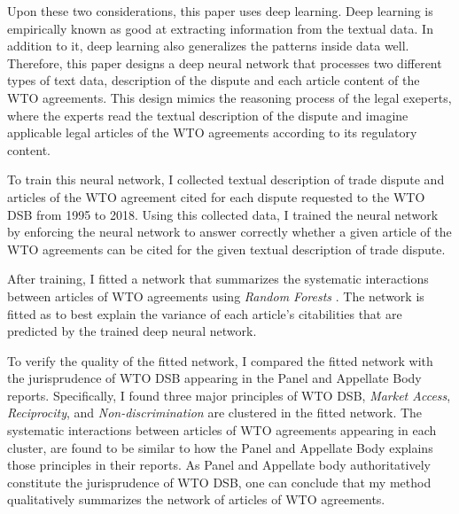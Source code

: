 Upon these two considerations, this paper uses deep learning. %
Deep learning is empirically known as good at extracting information from the textual data. 
In addition to it, deep learning also generalizes the patterns inside data well.
Therefore, this paper designs a deep neural network that
processes two different types of text data,
description of the dispute and each article content of the WTO agreements.
This design mimics the reasoning process of the legal exeperts, 
where the experts read
the textual description of the dispute and imagine applicable legal articles of the WTO agreements according to its regulatory content.

To train this neural network, I collected textual description of trade dispute and articles of the WTO agreement cited for each dispute requested to the WTO DSB
from 1995 to 2018. %
Using this collected data, I trained the neural network by enforcing the neural network to answer correctly
whether a given article of the WTO agreements
can be cited for the given textual description of
trade dispute. %
 
After training, I fitted a network that summarizes the systematic interactions between articles of WTO agreements using \textit{Random Forests} \citep{rf, genie3}.
The network is fitted as to best explain the variance of each article's citabilities that are predicted by the trained deep neural network. %

To verify the quality of the fitted network, I compared the fitted network with the jurisprudence of WTO DSB appearing in the Panel and Appellate Body reports.
Specifically, I found three major principles of WTO DSB, \textit{Market Access}, \textit{Reciprocity}, and \textit{Non-discrimination} are clustered in the fitted network.
The systematic interactions between articles of WTO agreements appearing in each cluster, are found to be similar to how the Panel and Appellate Body explains those principles in their reports.
As Panel and Appellate body authoritatively constitute the jurisprudence of WTO DSB, one can conclude that my method qualitatively summarizes the network of articles of WTO agreements.




